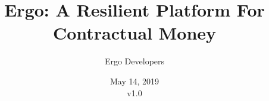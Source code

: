 \documentclass[]{article}
\begin{document}
    \title{Ergo: A Resilient Platform For Contractual Money}
    \author{Ergo Developers}

    \date{May 14, 2019\\v1.0}

    \maketitle

    

    

    

    

    

    

    

    


    
\end{document}

